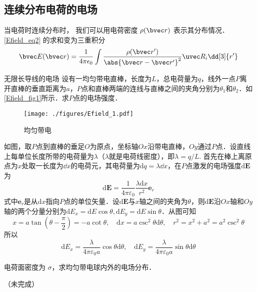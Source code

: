 \subsection{连续分布电荷的电场}
当电荷时连续分布时， 我们可以用电荷密度 $\rho(\bvec r)$ 表示其分布情况． \autoref{Efield_eq2} 的求和变为三重积分
\begin{equation}
\bvec E(\bvec r) = \frac{1}{4\pi\epsilon_0} \int \frac{\rho(\bvec r')}{\abs{\bvec r - \bvec r'}^2} \uvec R_i \dd[3]{r'}
\end{equation}

\begin{example}{无限长导线的电场}\label{Efield_ex1}
设有一均匀带电直棒，长度为$L$，总电荷量为$q$，线外一点$P $离开直棒的垂直距离为$a$，$P$点和直棒两端的连线与直棒之间的夹角分别为$\theta_1$和$\theta_2$．如\autoref{Efield_fig1}所示．求$P$点的电场强度．
\begin{figure}[ht]
\centering
\texttt{[image: ./figures/Efield\_1.pdf]}
\caption{均匀带电} \label{Efield_fig1}
\end{figure}

如图，取$P $点到直棒的垂足$O$为原点，坐标轴$Ox $沿带电直棒，$ Oy $通过$P $点．设直线上每单位长度所带的电荷量为$\lambda$（$\lambda$就是电荷线密度），即$\lambda=q/L$. 首先在棒上离原点为$x $处取一长度为$\dd{x}$的电荷元，其电荷量为$\mathrm dq=\lambda\dd{x}$，在$P $点激发的电场强度$\mathrm d\mathbf E$为
\begin{equation}
\mathrm{d} \mathbf{E}=\frac{1}{4 \pi \varepsilon_{0}} \frac{\lambda \mathrm{d} x}{r^{2}} \mathbf e_r
\end{equation}
式中$\mathbf e_r$是从$\mathrm dx$指向$P $点的单位矢量．设$\mathrm{d} \mathbf{E}$与$x$轴之间的夹角为$\theta$，则$\mathrm{d} \mathbf{E}$沿$Ox$轴和$Oy$轴的两个分量分别为$\mathrm{d} E_{x}=\mathrm{d} E \cos \theta, \mathrm{d} E_{y}=\mathrm{d} E \sin \theta$．从图可知
\begin{equation}
x=a \tan \left(\theta-\frac{\pi}{2}\right)=-a \cot \theta, \quad \mathrm{d} x=a \csc ^{2} \theta \mathrm{d} \theta, \quad r^{2}=x^{2}+a^{2}=a^{2} \csc ^{2} \theta
\end{equation}
所以
\begin{equation}
\mathrm{d} E_{x}=\frac{\lambda}{4 \pi \varepsilon_{0} a} \cos \theta \mathrm{d} \theta, \quad \mathrm{d} E_{y}=\frac{\lambda}{4 \pi \varepsilon_{0} a} \sin \theta \mathrm{d} \theta
\end{equation}
\end{example}


\begin{example}{ }\label{Efield_ex2}
电荷面密度为 $\sigma$，求均匀带电球内外的电场分布．

（未完成）
\end{example}
